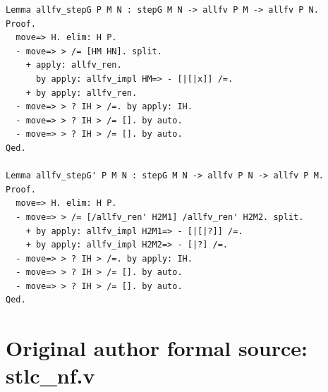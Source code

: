 \documentclass[10pt,a4paper]{article}
\begin{document}
\begin{lstlisting}[style=authorcoq]
Lemma allfv_stepG P M N : stepG M N -> allfv P M -> allfv P N.
Proof.
  move=> H. elim: H P.
  - move=> > /= [HM HN]. split.
    + apply: allfv_ren.
      by apply: allfv_impl HM=> - [|[|x]] /=.
    + by apply: allfv_ren.
  - move=> > ? IH > /=. by apply: IH.
  - move=> > ? IH > /= []. by auto.
  - move=> > ? IH > /= []. by auto.
Qed.

Lemma allfv_stepG' P M N : stepG M N -> allfv P N -> allfv P M.
Proof.
  move=> H. elim: H P.
  - move=> > /= [/allfv_ren' H2M1] /allfv_ren' H2M2. split.
    + by apply: allfv_impl H2M1=> - [|[|?]] /=.
    + by apply: allfv_impl H2M2=> - [|?] /=.
  - move=> > ? IH > /=. by apply: IH.
  - move=> > ? IH > /= []. by auto.
  - move=> > ? IH > /= []. by auto.
Qed.
\end{lstlisting}
\clearpage
\section*{Original author formal source: stlc\_nf.v}
\end{document}
